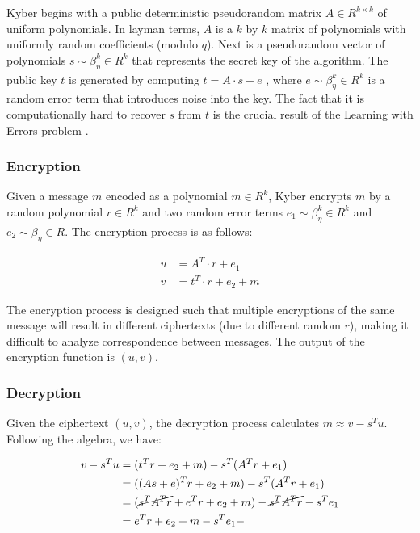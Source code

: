Kyber begins with a public deterministic pseudorandom matrix $A \in R^{k \times k}$ of uniform polynomials. In layman terms, $A$ is a $k$ by $k$ matrix of polynomials with uniformly random coefficients (modulo $q$). Next is a pseudorandom vector of polynomials $s \sim \beta_\eta^k \in R^k$ that represents the secret key of the algorithm. The public key $t$ is generated by computing $t = A \cdot s + e$ \cite{crystals-kyber}, where $e \sim \beta_\eta^k \in R^k$ is a random error term that introduces noise into the key. The fact that it is computationally hard to recover $s$ from $t$ is the crucial result of the Learning with Errors problem \cite{lwe}.

\subsubsection*{Encryption}

Given a message $m$ encoded as a polynomial $m \in R^k$, Kyber encrypts $m$ by a random polynomial $r \in R^k$ and two random error terms $e_1 \sim \beta_\eta^k \in R^k$ and $e_2 \sim \beta_\eta \in R$. The encryption process is as follows:

\begin{align*}
  u & = A^T \cdot r + e_1     \\
  v & = t^T \cdot r + e_2 + m
\end{align*}

The encryption process is designed such that multiple encryptions of the same message will result in different ciphertexts (due to different random $r$), making it difficult to analyze correspondence between messages. The output of the encryption function is $(u, v)$.

\subsubsection*{Decryption}

Given the ciphertext $(u, v)$, the decryption process calculates $m \approx v - s^Tu$. Following the algebra, we have:

\begin{align*}
  v - s^Tu & = (t^Tr + e_2 + m) - s^T (A^Tr + e_1)                              \\
           & = ((As + e)^Tr + e_2 + m) - s^T (A^Tr + e_1)                       \\
           & = (\cancel{s^TA^Tr} + e^Tr + e_2 + m) - \cancel{s^T A^Tr} - s^Te_1 \\
           & = e^Tr + e_2 + m - s^Te_1-
\end{align*}

